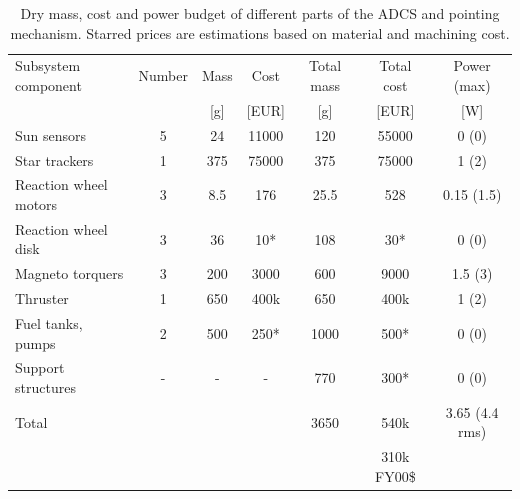 \begin{table}[h]
\begin{tabular}{l | c | c c | c c | c }
Subsystem component    & Number & Mass & Cost & Total mass & Total cost & Power (max)\\ 
                       &   & [g] & [EUR]& [g]  &[EUR] & [W]         \\ \hline \hline
Sun sensors            & 5 & 24  & 11000& 120   & 55000&  0 (0)      \\
Star trackers          & 1 & 375 & 75000& 375  & 75000&  1 (2)      \\ \hline
Reaction wheel motors  & 3 & 8.5 & 176  & 25.5 & 528  &  0.15 (1.5) \\
Reaction wheel disk    & 3 & 36  & 10*  & 108   & 30*  &  0 (0)      \\
Magneto torquers       & 3 & 200 & 3000 & 600  & 9000 &  1.5 (3)      \\ \hline
Thruster			   & 1 & 650 & 400k & 650  & 400k &  1 (2)			\\
Fuel tanks, pumps	   & 2 & 500 & 250* & 1000 & 500* & 0 (0)          \\ \hline
Support structures     & - &  -  & -	& 770  & 300*     & 0 (0)			\\ \hline
Total & & &                             & 3650 & 540k & 3.65 (4.4 rms) \\
&&&&& 310k FY00\$ &
\end{tabular}
\caption[Mass, cost and power budget of AODCS and pointing mechanism emitter]{Dry mass, cost and power budget of different parts of the \ac{ADCS} and pointing mechanism. Starred prices are estimations based on material and machining cost.}
\label{tab:adcspointbudgetemitter}
\end{table}